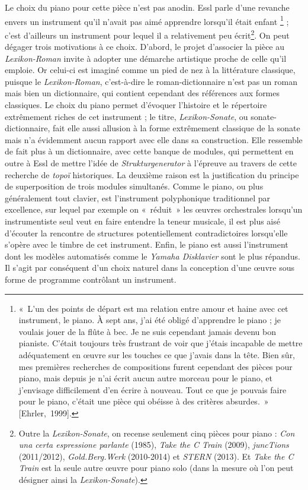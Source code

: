 \documentclass[a4paper,12pt]{article}
\newcommand{\guill}[1]{«~#1~»}
\newcommand{\cicite}[1]{{\footnotesize[#1]}}
\begin{document}
Le choix du piano pour cette pièce n'est pas anodin. Essl parle d'une revanche envers un instrument qu'il n'avait pas aimé apprendre lorsqu'il était enfant
\footnote{\guill{L'un des points de départ est ma relation entre amour et haine avec cet instrument, le piano. À sept ans, j'ai été obligé d'apprendre le piano ; je voulais jouer de la flûte à bec. Je ne suis cependant jamais devenu bon pianiste. C'était toujours très frustrant de voir que j'étais incapable de mettre adéquatement en œuvre sur les touches ce que j'avais dans la tête. Bien sûr, mes premières recherches de compositions furent cependant des pièces pour piano, mais depuis je n'ai écrit aucun autre morceau pour le piano, et j'envisage difficilement d'en écrire à nouveau. Tout ce que je pouvais faire pour le piano, c'était une pièce qui obéisse à des critères absurdes.} \cicite{Ehrler,~1999}.} ; c'est d'ailleurs un instrument pour lequel il a relativement peu écrit\footnote{Outre la \emph{Lexikon-Sonate}, on recense seulement cinq pièces pour piano : \emph{Con una certa espressione parlante} (1985), \emph{Take the C Train} (2009), \emph{juncTions} (2011/2012), \emph{Gold.Berg.Werk} (2010-2014) et \emph{STERN} (2013). Et \emph{Take the C Train} est la seule autre œuvre pour piano solo (dans la mesure où l'on peut désigner ainsi la \emph{Lexikon-Sonate}).}. On peut dégager trois motivations à ce choix. D'abord, le projet d'associer la pièce au \emph{Lexikon-Roman} invite à adopter une démarche artistique proche de celle qu'il emploie. Or celui-ci est imaginé comme un pied de nez à la littérature classique, puisque le \emph{Lexikon-Roman}, c'est-à-dire le roman-dictionnaire n'est pas un roman mais bien un dictionnaire, qui contient cependant des références aux formes classiques. Le choix du piano permet d'évoquer l'histoire et le répertoire extrêmement riches de cet instrument ; le titre, \emph{Lexikon-Sonate}, ou sonate-dictionnaire, fait elle aussi allusion à la forme extrêmement classique de la sonate mais n'a évidemment aucun rapport avec elle dans sa construction. Elle ressemble de fait plus à un dictionnaire, avec cette banque de modules, qui permettent en outre à Essl de mettre l'idée de \emph{Strukturgenerator} à l'épreuve au travers de cette recherche de \emph{topoï} historiques. La deuxième raison est la justification du principe de superposition de trois modules simultanés. Comme le piano, ou plus généralement tout clavier, est l'instrument polyphonique traditionnel par excellence, sur lequel par exemple on \guill{réduit} les œuvres orchestrales lorsqu'un instrumentiste seul veut en faire entendre la teneur musicale, il est plus aisé d'écouter la rencontre de structures potentiellement contradictoires lorsqu'elle s'opère avec le timbre de cet instrument. Enfin, le piano est aussi l'instrument dont les modèles automatisés comme le \emph{Yamaha Disklavier} sont le plus répandus. Il s'agit par conséquent d'un choix naturel dans la conception d'une œuvre sous forme de programme contrôlant un instrument.
\end{document}
